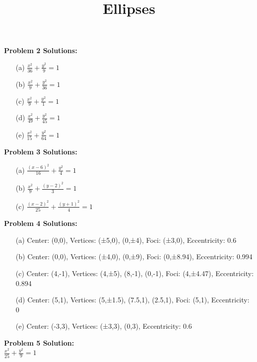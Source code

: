 \documentclass{article}
\begin{document}
\title{Ellipses}
\maketitle

\textbf{Problem 2 Solutions:}
\begin{enumerate}
    \item[(a)] $\frac{x^2}{36} + \frac{y^2}{9} = 1$
    \item[(b)] $\frac{x^2}{9} + \frac{y^2}{36} = 1$
    \item[(c)] $\frac{x^2}{9} + \frac{y^2}{1} = 1$
    \item[(d)] $\frac{x^2}{49} + \frac{y^2}{45} = 1$
    \item[(e)] $\frac{x^2}{15} + \frac{y^2}{64} = 1$
\end{enumerate}

\textbf{Problem 3 Solutions:}
\begin{enumerate}
    \item[(a)] $\frac{(x - 6)^2}{16} + \frac{y^2}{4} = 1$
    \item[(b)] $\frac{x^2}{9} + \frac{(y - 2)^2}{3} = 1$
    \item[(c)] $\frac{(x - 2)^2}{25} + \frac{(y + 1)^2}{4} = 1$
\end{enumerate}

\textbf{Problem 4 Solutions:}
\begin{enumerate}
    \item[(a)] Center: (0,0), Vertices: (±5,0), (0,±4), Foci: (±3,0), Eccentricity: 0.6
    \item[(b)] Center: (0,0), Vertices: (±4,0), (0,±9), Foci: (0,±8.94), Eccentricity: 0.994
    \item[(c)] Center: (4,-1), Vertices: (4,±5), (8,-1), (0,-1), Foci: (4,±4.47), Eccentricity: 0.894
    \item[(d)] Center: (5,1), Vertices: (5,±1.5), (7.5,1), (2.5,1), Foci: (5,1), Eccentricity: 0
    \item[(e)] Center: (-3,3), Vertices: (±3,3), (0,3), Eccentricity: 0.6
\end{enumerate}

\textbf{Problem 5 Solution:} \\

$\frac{x^2}{25} + \frac{y^2}{9} = 1$
\end{document}
